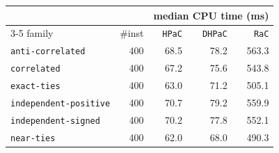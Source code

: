 \begin{tabular}{@{}lrrrr@{}}
\toprule
 &  & \multicolumn{3}{c}{median CPU time (ms)} \\
\cmidrule(l){3-5}
family & \#inst & \texttt{HPaC} & \texttt{DHPaC} & \texttt{RaC} \\
\midrule
\texttt{anti-correlated} & 400 & 68.5 & 78.2 & 563.3 \\
\texttt{correlated} & 400 & 67.2 & 75.6 & 543.8 \\
\texttt{exact-ties} & 400 & 63.0 & 71.2 & 505.1 \\
\texttt{independent-positive} & 400 & 70.7 & 79.2 & 559.9 \\
\texttt{independent-signed} & 400 & 70.2 & 77.8 & 552.1 \\
\texttt{near-ties} & 400 & 62.0 & 68.0 & 490.3 \\
\bottomrule
\end{tabular}
